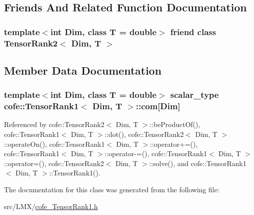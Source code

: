 \subsection{Friends And Related Function Documentation}
\hypertarget{classcofe_1_1TensorRank1_a99d6c8ee5a264ecaac00ed0cece3ed03}{
\subsubsection[{Tensor\-Rank2$<$ Dim, T $>$}]{\setlength{\rightskip}{0pt plus 5cm}template$<$int Dim, class T = double$>$ friend class {\bf Tensor\-Rank2}$<$ Dim, T $>$\hspace{0.3cm}{\ttfamily [friend]}}}\label{classcofe_1_1TensorRank1_a99d6c8ee5a264ecaac00ed0cece3ed03}


\subsection{Member Data Documentation}
\hypertarget{classcofe_1_1TensorRank1_abdb5cad4f516b76641384b815b2c6c66}{
\subsubsection[{com}]{\setlength{\rightskip}{0pt plus 5cm}template$<$int Dim, class T = double$>$ {\bf scalar\-\_\-type} {\bf cofe\-::\-Tensor\-Rank1}$<$ Dim, T $>$\-::com\mbox{[}Dim\mbox{]}\hspace{0.3cm}{\ttfamily [protected]}}}\label{classcofe_1_1TensorRank1_abdb5cad4f516b76641384b815b2c6c66}


Referenced by cofe\-::\-Tensor\-Rank2$<$ Dim, T $>$\-::be\-Product\-Of(), cofe\-::\-Tensor\-Rank1$<$ Dim, T $>$\-::dot(), cofe\-::\-Tensor\-Rank2$<$ Dim, T $>$\-::operate\-On(), cofe\-::\-Tensor\-Rank1$<$ Dim, T $>$\-::operator+=(), cofe\-::\-Tensor\-Rank1$<$ Dim, T $>$\-::operator-\/=(), cofe\-::\-Tensor\-Rank1$<$ Dim, T $>$\-::operator=(), cofe\-::\-Tensor\-Rank2$<$ Dim, T $>$\-::solve(), and cofe\-::\-Tensor\-Rank1$<$ Dim, T $>$\-::\-Tensor\-Rank1().



The documentation for this class was generated from the following file\-:\begin{DoxyCompactItemize}
\item 
src/\-L\-M\-X/\hyperlink{cofe__TensorRank1_8h}{cofe\-\_\-\-Tensor\-Rank1.\-h}\end{DoxyCompactItemize}
